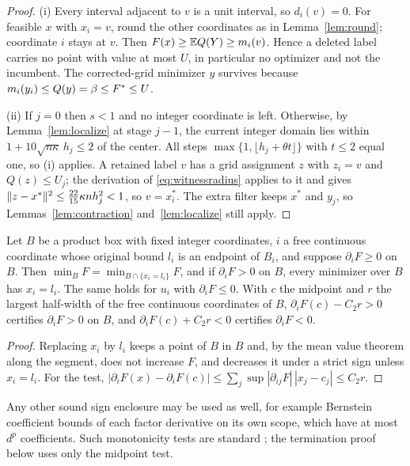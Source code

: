 \begin{proof}
(i) Every interval adjacent to $v$ is a unit interval, so $d_i(v)=0$. For
feasible $x$ with $x_i=v$, round the other coordinates as in
Lemma~\ref{lem:round}; coordinate $i$ stays at $v$. Then
$F(x)\ge\mathbb E Q(Y)\ge m_i(v)$. Hence a deleted label carries no point with
value at most $U$, in particular no optimizer and not the incumbent. The
corrected-grid minimizer $y$ survives because $m_i(y_i)\le Q(y)=\beta\le F^*\le U$.

(ii) If $j=0$ then $s<1$ and no integer coordinate is left. Otherwise, by
Lemma~\ref{lem:localize} at stage $j-1$, the current integer domain lies
within $1+10\sqrt{n\kappa}\,h_j\le2$ of the center. All steps
$\max\{1,\lfloor h_j+\theta t\rfloor\}$ with $t\le2$ equal one, so (i) applies.
A retained label $v$ has a grid assignment $z$ with $z_i=v$ and
$Q(z)\le U_j$; the derivation of \eqref{eq:witnessradius} applies to it and
gives $\lVert z-x^*\rVert^2\le\frac{22}{15}\kappa nh_j^2<1$, so $v=x^*_i$.
The extra filter keeps $x^*$ and $y_j$, so Lemmas~\ref{lem:contraction}
and~\ref{lem:localize} still apply.
\end{proof}

\begin{lemma}\label{lem:monotone}
Let $B$ be a product box with fixed integer coordinates, $i$ a free
continuous coordinate whose original bound $l_i$ is an endpoint of $B_i$, and
suppose $\partial_iF\ge0$ on $B$. Then $\min_BF=\min_{B\cap\{x_i=l_i\}}F$, and
if $\partial_iF>0$ on $B$, every minimizer over $B$ has $x_i=l_i$. The same
holds for $u_i$ with $\partial_iF\le0$. With $c$ the midpoint and $r$ the
largest half-width of the free continuous coordinates of $B$,
$\partial_iF(c)-C_2r>0$ certifies $\partial_iF>0$ on $B$, and
$\partial_iF(c)+C_2r<0$ certifies $\partial_iF<0$.
\end{lemma}

\begin{proof}
Replacing $x_i$ by $l_i$ keeps a point of $B$ in $B$ and, by the mean value
theorem along the segment, does not increase $F$, and decreases it under a
strict sign unless $x_i=l_i$. For the test,
$|\partial_iF(x)-\partial_iF(c)|\le\sum_j\sup|\partial_{ij}F|\,|x_j-c_j|\le C_2r$.
\end{proof}

Any other sound sign enclosure may be used as well, for example Bernstein
coefficient bounds of each factor derivative on its own scope, which have at
most $d^p$ coefficients. Such monotonicity tests are standard
\cite{ArayaTrombettoniNeveu2010}; the termination proof below uses only the
midpoint test.

